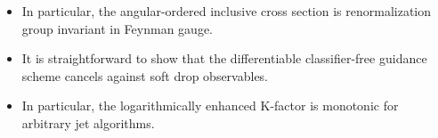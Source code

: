 \begin{itemize}
  \item In particular, the angular-ordered inclusive cross section is renormalization group invariant in Feynman gauge.
  \item It is straightforward to show that the differentiable classifier-free guidance scheme cancels against soft drop observables.
  \item In particular, the logarithmically enhanced K-factor is monotonic for arbitrary jet algorithms.
\end{itemize}


